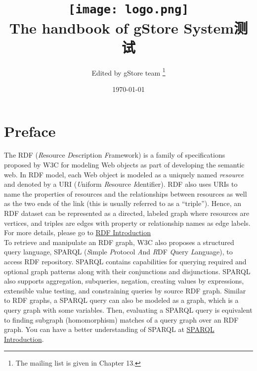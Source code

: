 \documentclass[titlepage, a4paper, 12pt]{article}
\begin{document}
\title{\texttt{[image: logo.png]} \\
	The handbook of gStore System测试}
\author{Edited by gStore team \footnote{The mailing list is given in Chapter 13.}}
\date{\today}
\maketitle



\setcounter{tocdepth}{4}
\tableofcontents
\clearpage

\section{Preface}
The RDF (\emph{R}esource \emph{D}escription \emph{F}ramework) is a family of specifications proposed by W3C for modeling Web objects as part of developing the semantic web. In RDF model, each Web object is modeled as a uniquely named \emph{resource} and denoted by a URI (\emph{U}niform \emph{R}esource \emph{I}dentifier). RDF also uses URIs to name the properties of resources and the relationships between resources as well as the two ends of the link (this is usually referred to as a ``triple''). Hence, an RDF dataset can be represented as a directed, labeled graph where resources are vertices, and triples are
edges with property or relationship names as edge labels. For more details, please go to \href{https://www.w3.org/RDF/}{RDF Introduction}\\

To retrieve and manipulate an RDF graph, W3C also proposes a structured query language, SPARQL (\emph{S}imple \emph{P}rotocol \emph{A}nd \emph{R}DF \emph{Q}uery \emph{L}anguage), to access RDF repository. SPARQL contains capabilities for querying required and optional graph patterns along with their conjunctions and disjunctions. SPARQL also supports aggregation, subqueries, negation, creating values by expressions, extensible value testing, and constraining queries by source RDF graph. Similar to RDF graphs, a SPARQL query can also be modeled as a graph, which is a query graph with some variables. Then, evaluating a SPARQL query is equivalent to finding subgraph (homomorphism) matches of a query graph over an RDF graph. You can have a better understanding of SPARQL at \href{https://www.w3.org/TR/sparql11-query/}{SPARQL Introduction}.\\
\end{document}
